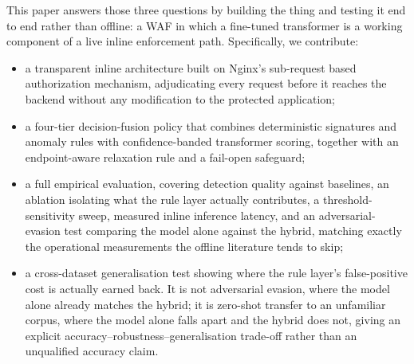 \documentclass[conference]{IEEEtran}
\begin{document}
This paper answers those three questions by building the thing and testing
it end to end rather than offline: a WAF in which a fine-tuned transformer
is a working component of a live inline enforcement path. Specifically, we
contribute:
\begin{itemize}
\item a transparent inline architecture built on Nginx's sub-request
based authorization mechanism, adjudicating every request before it
reaches the backend without any modification to the protected application;
\item a four-tier decision-fusion policy that combines deterministic
signatures and anomaly rules with confidence-banded transformer scoring,
together with an endpoint-aware relaxation rule and a fail-open safeguard;
\item a full empirical evaluation, covering detection quality against
baselines, an ablation isolating what the rule layer actually
contributes, a threshold-sensitivity sweep, measured inline inference
latency, and an adversarial-evasion test comparing the model alone
against the hybrid, matching exactly the operational measurements the
offline literature tends to skip;
\item a cross-dataset generalisation test showing where the rule layer's
false-positive cost is actually earned back. It is not adversarial evasion,
where the model alone already matches the hybrid; it is zero-shot transfer
to an unfamiliar corpus, where the model alone falls apart and the hybrid
does not, giving an explicit accuracy--robustness--generalisation
trade-off rather than an unqualified accuracy claim.
\end{itemize}
\end{document}

